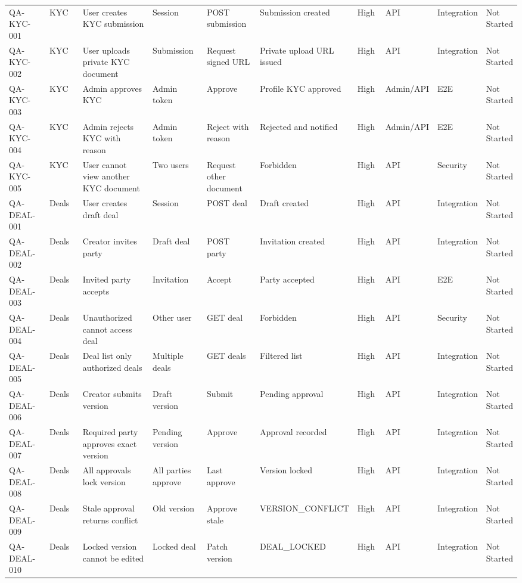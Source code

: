 \begin{longtable}{p{0.12\linewidth}p{0.1\linewidth}p{0.22\linewidth}p{0.14\linewidth}p{0.14\linewidth}p{0.14\linewidth}p{0.07\linewidth}p{0.08\linewidth}p{0.1\linewidth}p{0.08\linewidth}}
QA-KYC-001 & KYC & User creates KYC submission & Session & POST submission & Submission created & High & API & Integration & Not Started \\
QA-KYC-002 & KYC & User uploads private KYC document & Submission & Request signed URL & Private upload URL issued & High & API & Integration & Not Started \\
QA-KYC-003 & KYC & Admin approves KYC & Admin token & Approve & Profile KYC approved & High & Admin/API & E2E & Not Started \\
QA-KYC-004 & KYC & Admin rejects KYC with reason & Admin token & Reject with reason & Rejected and notified & High & Admin/API & E2E & Not Started \\
QA-KYC-005 & KYC & User cannot view another KYC document & Two users & Request other document & Forbidden & High & API & Security & Not Started \\
QA-DEAL-001 & Deals & User creates draft deal & Session & POST deal & Draft created & High & API & Integration & Not Started \\
QA-DEAL-002 & Deals & Creator invites party & Draft deal & POST party & Invitation created & High & API & Integration & Not Started \\
QA-DEAL-003 & Deals & Invited party accepts & Invitation & Accept & Party accepted & High & API & E2E & Not Started \\
QA-DEAL-004 & Deals & Unauthorized cannot access deal & Other user & GET deal & Forbidden & High & API & Security & Not Started \\
QA-DEAL-005 & Deals & Deal list only authorized deals & Multiple deals & GET deals & Filtered list & High & API & Integration & Not Started \\
QA-DEAL-006 & Deals & Creator submits version & Draft version & Submit & Pending approval & High & API & Integration & Not Started \\
QA-DEAL-007 & Deals & Required party approves exact version & Pending version & Approve & Approval recorded & High & API & Integration & Not Started \\
QA-DEAL-008 & Deals & All approvals lock version & All parties approve & Last approve & Version locked & High & API & Integration & Not Started \\
QA-DEAL-009 & Deals & Stale approval returns conflict & Old version & Approve stale & VERSION\_CONFLICT & High & API & Integration & Not Started \\
QA-DEAL-010 & Deals & Locked version cannot be edited & Locked deal & Patch version & DEAL\_LOCKED & High & API & Integration & Not Started \\

\end{longtable}
